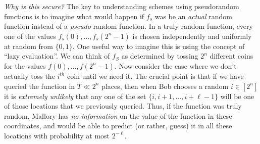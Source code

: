 \emph{Why is this secure?} The key to understanding schemes using
pseudorandom functions is to imagine what would happen if \(f_s\) was be
an \emph{actual} random function instead of a \emph{pseudo} random
function. In a truly random function, every one of the values
\(f_s(0),\ldots,f_s(2^n-1)\) is chosen independently and uniformly at
random from \(\{0,1\}\). One useful way to imagine this is using the
concept of ``lazy evaluation''. We can think of \(f_S\) as determined by
tossing \(2^n\) different coins for the values \(f(0),\ldots,f(2^n-1)\).
Now consider the case where we don't actually toss the \(i^{th}\) coin
until we need it. The crucial point is that if we have queried the
function in \(T\ll 2^n\) places, then when Bob chooses a random
\(i\in[2^n]\) it is \emph{extremely unlikely} that any one of the set
\(\{i,i+1,\ldots,i+\ell-1\}\) will be one of those locations that we
previously queried. Thus, if the function was truly random, Mallory has
\emph{no information} on the value of the function in these coordinates,
and would be able to predict (or rather, guess) it in all these
locations with probability at most \(2^{-\ell}\).


\hypertarget{loginprfthm}{}


